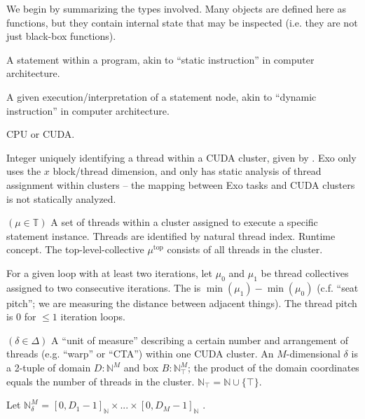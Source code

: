 




We begin by summarizing the types involved.
Many objects are defined here as functions, but they contain internal state that may be inspected (i.e. they are not just black-box functions).

\filbreak
{} A statement within a program, akin to ``static instruction'' in computer architecture.

\filbreak
{} A given execution/interpretation of a statement node, akin to ``dynamic instruction'' in computer architecture.

\filbreak
{} CPU or CUDA.

\filbreak
{} Integer uniquely identifying a thread within a CUDA cluster, given by .
Exo only uses the $x$ block/thread dimension, and only has static analysis of thread assignment within clusters -- the mapping between Exo tasks and CUDA clusters is not statically analyzed.

\filbreak
{} $(\mu \in \mathbb{T})$ A set of threads within a cluster assigned to execute a specific statement instance.
Threads are identified by natural thread index.
Runtime concept.
The top-level-collective $\mu^\text{top}$ consists of all threads in the cluster.

For a given  loop with at least two iterations, let $\mu_0$ and $\mu_1$ be thread collectives assigned to two consecutive iterations.
The  is $\min(\mu_1) - \min(\mu_0)$
(c.f. ``seat pitch''; we are measuring the distance between adjacent things).
The thread pitch is 0 for $\le 1$ iteration loops.

\filbreak
{} $(\delta \in \Delta)$ A ``unit of measure'' describing a certain number and arrangement of threads (e.g. ``warp'' or ``CTA'') within one CUDA cluster.
An $M$-dimensional $\delta$ is a 2-tuple of domain $D: \mathbb{N}^M$ and box $B: \mathbb{N}_\top^M$; the product of the domain coordinates equals the number of threads in the cluster.
$\mathbb{N}_\top = \mathbb{N} \cup \{\top\}$.

Let $\mathbb{N}^M_\delta$ = $[0, D_1 - 1]_\mathbb{N} \times ... \times [0, D_M - 1]_\mathbb{N}$ .

